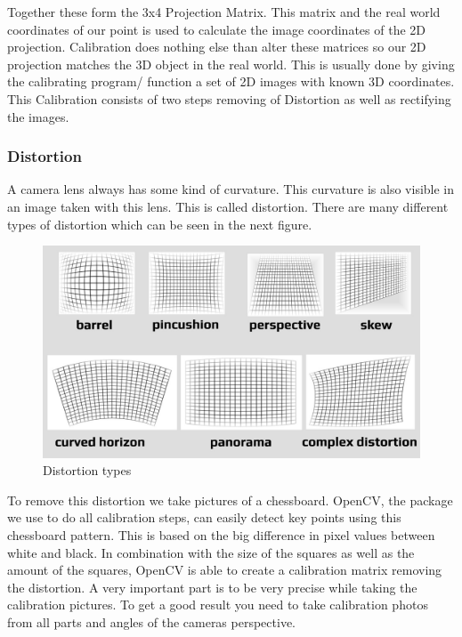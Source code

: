 \documentclass[journal,onecolumn]{IEEEtran}
\begin{document}
\noindent
Together these form the 3x4 Projection Matrix. This matrix and the real world coordinates of our point is used to calculate the image coordinates of the 2D projection. Calibration does nothing else than alter these matrices so our 2D projection matches the 3D object in the real world. This is usually done by giving the calibrating program/ function a set of 2D images with known 3D coordinates. 
This Calibration consists of two steps removing of Distortion as well as rectifying the images\cite{ImageRectification}. \newline
\subsubsection{Distortion}
\noindent
A camera lens always has some kind of curvature. This curvature is also visible in an image taken with this lens. This is called distortion. There are many different types of distortion which can be seen in the next figure.
\begin{figure}[H]
	\centering
	\includegraphics[scale=0.3]{distortion.jpg}
	\captionsetup{justification=centering}
	\caption{Distortion types}
\end{figure}
\noindent
To remove this distortion we take pictures of a chessboard. OpenCV, the package we use to do all calibration steps, can easily detect key points using this chessboard pattern. This is based on the big difference in pixel values between white and black. In combination with the size of the squares as well as the amount of the squares, OpenCV is able to create a calibration matrix removing the distortion.\newline
A very important part is to be very precise while taking the calibration pictures. To get a good result you need to take calibration photos from all parts and angles of the cameras perspective.\newline
\end{document}
